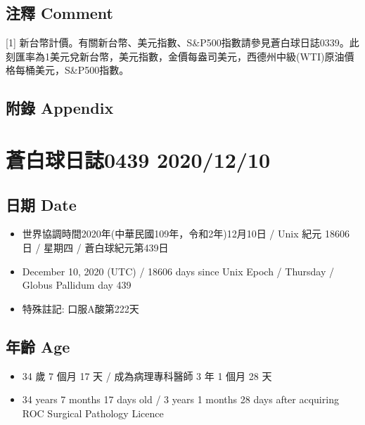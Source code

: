\documentclass[a5paper, 11pt
]{book}
\providecommand{\tightlist}{%
  \setlength{\itemsep}{0pt}\setlength{\parskip}{0pt}}
\begin{document}
\hypertarget{ux6ce8ux91cb-comment-8}{%
\subsection{注釋 Comment}\label{ux6ce8ux91cb-comment-8}}

{[}1{]}
新台幣計價。有關新台幣、美元指數、S\&P500指數請參見蒼白球日誌0339。此刻匯率為1美元兌新台幣，美元指數，金價每盎司美元，西德州中級(WTI)原油價格每桶美元，S\&P500指數。

\hypertarget{ux9644ux9304-appendix-8}{%
\subsection{附錄 Appendix}\label{ux9644ux9304-appendix-8}}

\hypertarget{ux84bcux767dux7403ux65e5ux8a8c0439-20201210}{%
\section{蒼白球日誌0439
2020/12/10}\label{ux84bcux767dux7403ux65e5ux8a8c0439-20201210}}

\hypertarget{ux65e5ux671f-date-9}{%
\subsection{日期 Date}\label{ux65e5ux671f-date-9}}

\begin{itemize}
\tightlist
\item
  世界協調時間2020年(中華民國109年，令和2年)12月10日 / Unix 紀元 18606
  日 / 星期四 / 蒼白球紀元第439日
\item
  December 10, 2020 (UTC) / 18606 days since Unix Epoch / Thursday /
  Globus Pallidum day 439
\item
  特殊註記: 口服A酸第222天
\end{itemize}

\hypertarget{ux5e74ux9f61-age-9}{%
\subsection{年齡 Age}\label{ux5e74ux9f61-age-9}}

\begin{itemize}
\tightlist
\item
  34 歲 7 個月 17 天 / 成為病理專科醫師 3 年 1 個月 28 天
\item
  34 years 7 months 17 days old / 3 years 1 months 28 days after
  acquiring ROC Surgical Pathology Licence
\end{itemize}
\end{document}
